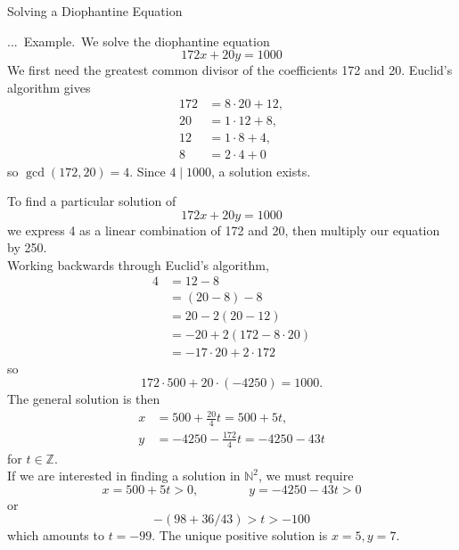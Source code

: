 \documentclass[smaller,hyperref={CJKbookmarks=true}]{beamer}
\newcommand{\N}{\mathbb{N}} \newcommand{\Z}{\mathbb{Z}} \newcommand{\Q}{\mathbb{Q}}
\newcounter{zhuo}[subsection]
\renewcommand{\thezhuo}{\thesection.\thesubsection.\arabic{zhuo}}
\newenvironment{EXAMPLE}{\stepcounter{zhuo}\alert{\!\thezhuo.~Example.\,}}{}
\begin{document}
\begin{frame}{Solving a Diophantine Equation}
\begin{spacing}{1.1}
\begin{EXAMPLE}
We solve the diophantine equation
\[172x+20y=1000\]
We first need the greatest common divisor of the coefficients 172 and 20.
Euclid's algorithm gives
\begin{align*}
  172 &=8\cdot20+12, \\
  20 &=1\cdot12+8, \\
  12 &=1\cdot8+4, \\
  8 &=2\cdot4+0
\end{align*}
so $\gcd(172,20)=4$. Since $4\mid 1000$, a solution exists.
\end{EXAMPLE}
\end{spacing}
\newpage
\begin{spacing}{1}
To find a particular solution of
\[172x+20y=1000\]
we express 4 as a linear combination of 172 and 20, then multiply our equation by 250.\\[4pt]
Working backwards through Euclid's algorithm,
\begin{equation*}
  \begin{split}
     4 &=12-8 \\
       &=(20-8)-8 \\
       &=20-2(20-12) \\
       &=-20+2(172-8\cdot20) \\
       &=-17\cdot20+2\cdot172
  \end{split}
\end{equation*}
so
\[172\cdot500+20\cdot(-4250)=1000.\]
\newpage
The general solution is then
\begin{align*}
  x &=500+\frac{20}{4}t=500+5t, \\
  y &=-4250-\frac{172}{4}t=-4250-43t
\end{align*}
for $t\in\Z$.\\[4pt]
If we are interested in finding a solution in $\N^2$, we must require
\[x=500+5t>0,\qquad\qquad y=-4250-43t>0\]
or
\[-(98+36/43)>t>-100\]
which amounts to $t=-99$. The unique positive solution is $x=5,y=7$.
\end{spacing}
\end{frame}
\end{document}
